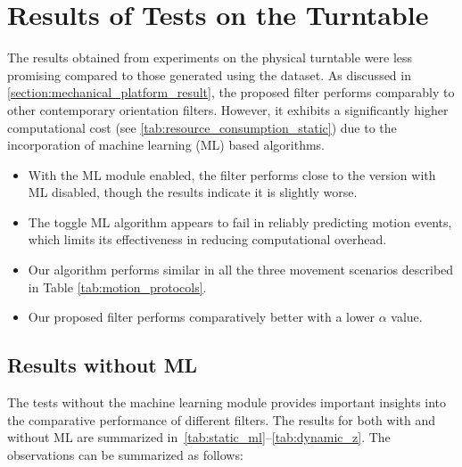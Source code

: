 \documentclass{iutbscthesis}
\begin{document}
\section{Results of Tests on the Turntable}

The results obtained from experiments on the physical turntable were less promising compared to those generated using the dataset. As discussed in \autoref{section:mechanical_platform_result}, the proposed filter performs comparably to other contemporary orientation filters. However, it exhibits a significantly higher computational cost (see \autoref{tab:resource_consumption_static}) due to the incorporation of machine learning (ML) based algorithms.

\begin{itemize}
    \item With the ML module enabled, the filter performs close to the version with ML disabled, though the results indicate it is slightly worse. 
    \item The toggle ML algorithm appears to fail in reliably predicting motion events, which limits its effectiveness in reducing computational overhead.
    \item Our algorithm performs similar in all the three movement scenarios described in Table \ref{tab:motion_protocols}. 
    \item Our proposed filter performs comparatively better with a lower $\alpha$ value.
\end{itemize}

\subsection{Results without ML}\label{subsec:withoutML}

The tests without the machine learning module provides important insights into the comparative performance of different filters. The results for both with and without ML are summarized in~\autoref{tab:static_ml}--\autoref{tab:dynamic_z}. The observations can be summarized as follows:
\end{document}
